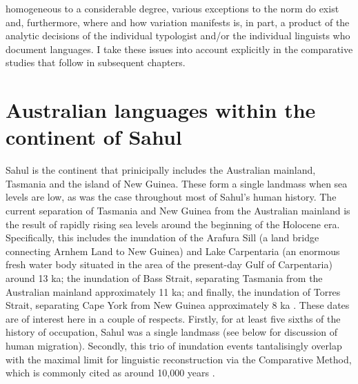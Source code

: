 homogeneous to a considerable degree, various exceptions to the norm do exist and, furthermore, where and how variation manifests is, in part, a product of the analytic decisions of the individual typologist and/or the individual linguists who document languages. I take these issues into account explicitly in the comparative studies that follow in subsequent chapters.

\hypertarget{sahul-context}{%
\section{Australian languages within the continent of Sahul}\label{sahul-context}}

Sahul is the continent that prinicipally includes the Australian mainland, Tasmania and the island of New Guinea. These form a single landmass when sea levels are low, as was the case throughout most of Sahul's human history. The current separation of Tasmania and New Guinea from the Australian mainland is the result of rapidly rising sea levels around the beginning of the Holocene era. Specifically, this includes the inundation of the Arafura Sill (a land bridge connecting Arnhem Land to New Guinea) and Lake Carpentaria (an enormous fresh water body situated in the area of the present-day Gulf of Carpentaria) around 13 ka; the inundation of Bass Strait, separating Tasmania from the Australian mainland approximately 11 ka; and finally, the inundation of Torres Strait, separating Cape York from New Guinea approximately 8 ka \autocites{reeves_sedimentary_2008}{williams_sea-level_2018}. These dates are of interest here in a couple of respects. Firstly, for at least five sixths of the history of occupation, Sahul was a single landmass (see below for discussion of human migration). Secondly, this trio of inundation events tantalisingly overlap with the maximal limit for linguistic reconstruction via the Comparative Method, which is commonly cited as around 10,000 years \autocite[p.~135]{nichols_sprung_1997}.

